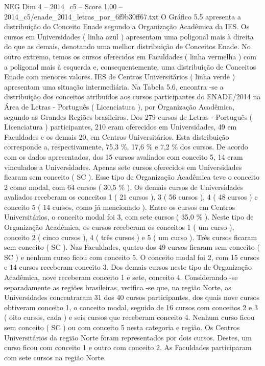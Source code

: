 \begin{textsample}{NEG Dim 4 – 2014\_c5 – Score 1.00 – 2014\_c5/enade\_2014\_letras\_por\_6f9b30ff67.txt}
O Gráfico 5.5 apresenta a distribuição do Conceito Enade segundo a Organização Acadêmica da IES.
Os cursos em Universidades ( linha azul ) apresentam uma poligonal mais à direita do que as demais, denotando uma melhor distribuição de Conceitos Enade.
No outro extremo, temos os cursos oferecidos em Faculdades ( linha vermelha ) com a poligonal mais à esquerda e, consequentemente, uma distribuição de Conceitos Enade com menores valores.
IES de Centros Universitários ( linha verde ) apresentam uma situação intermediária.
Na Tabela 5.6, encontra -se a distribuição dos conceitos atribuídos aos cursos participantes do ENADE/2014 na Área de Letras - Português ( Licenciatura ), por Organização Acadêmica, segundo as Grandes Regiões brasileiras.
Dos 279 cursos de Letras - Português ( Licenciatura ) participantes, 210 eram oferecidos em Universidades, 49 em Faculdades e os demais 20, em Centros Universitários.
Esta distribuição corresponde a, respectivamente, 75,3 \%, 17,6 \% e 7,2 \% dos cursos.
De acordo com os dados apresentados, dos 15 cursos avaliados com conceito 5, 14 eram vinculados a Universidades.
Apenas sete cursos oferecidos em Universidades ficaram sem conceito ( SC ).
Esse tipo de Organização Acadêmica teve o conceito 2 como modal, com 64 cursos ( 30,5 \% ).
Os demais cursos de Universidades avaliados receberam os conceitos 1 ( 21 cursos ), 3 ( 56 cursos ), 4 ( 48 cursos ) e conceito 5 ( 14 cursos, como já mencionado ).
Entre os cursos em Centros Universitários, o conceito modal foi 3, com sete cursos ( 35,0 \% ).
Neste tipo de Organização Acadêmica, os cursos receberam os conceitos 1 ( um curso ), conceito 2 ( cinco cursos ), 4 ( três cursos ) e 5 ( um curso ).
Três cursos ficaram sem conceito ( SC ).
Nas Faculdades, quatro dos 49 cursos ficaram sem conceito ( SC ) e nenhum curso ficou com conceito 5.
O conceito modal foi 2, com 15 cursos e 14 cursos receberam conceito 3.
Dos demais cursos neste tipo de Organização Acadêmica, nove receberam conceito 1 e sete, conceito 4.
Considerando -se separadamente as regiões brasileiras, verifica -se que, na região Norte, as Universidades concentraram 31 dos 40 cursos participantes, dos quais nove cursos obtiveram conceito 1, o conceito modal, seguido de 16 cursos com conceitos 2 e 3 ( oito cursos, cada ) e seis cursos que receberam conceito 4.
Nenhum curso ficou sem conceito ( SC ) ou com conceito 5 nesta categoria e região.
Os Centros Universitários da região Norte foram representados por dois cursos.
Destes, um curso ficou com conceito 1 e outro com conceito 2.
As Faculdades participaram com sete cursos na região Norte.

\end{textsample}
